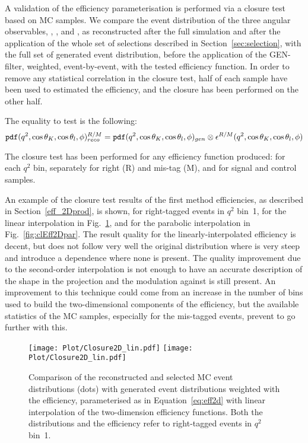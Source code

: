 A validation of the efficiency parameterisation is performed via a closure test based on MC samples.
We compare the event distribution of the three angular observables, \cTK, \cTL, and \PHI, as reconstructed after the full simulation and after the application of the whole set of selections described in Section~\ref{sec:selection}, with the full set of generated event distribution, before the application of the GEN-filter, weighted, event-by-event, with the tested efficiency function.
In order to remove any statistical correlation in the closure test, half of each sample have been used to estimated the efficiency, and the closure has been performed on the other half.

The equality to test is the following:
\begin{equation}\label{eq:effClosure}
    \mathtt{pdf}(q^2,\cos\theta_K,\cos\theta_l,\phi)_{reco}^{R/M}=\mathtt{pdf}(q^2,\cos\theta_K,\cos\theta_l,\phi)_{gen}\otimes\epsilon^{R/M}(q^2,\cos\theta_K,\cos\theta_l,\phi)
\end{equation}

The closure test has been performed for any efficiency function produced: for each $q^2$ bin, separately for right (R) and mis-tag (M), and for signal and control samples.

An example of the closure test results of the first method efficiencies, as described in Section~\ref{eff_2Dprod}, is shown, for right-tagged events in $q^2$ bin~1, for the linear interpolation in Fig.~\ref{fig:clEff2Dlin}, and for the parabolic interpolation in Fig.~\ref{fig:clEff2Dpar}.
The result quality for the linearly-interpolated efficiency is decent, but does not follow very well the original distribution where is very steep and introduce a \PHI dependence where none is present.
The quality improvement due to the second-order interpolation is not enough to have an accurate description of the shape in the \cTK projection and the modulation against \PHI is still present.
An improvement to this technique could come from an increase in the number of bins used to build the two-dimensional components of the efficiency, but the available statistics of the MC samples, especially for the mis-tagged events, prevent to go further with this.

\begin{figure}[hbt]
    \texttt{[image: Plot/Closure2D\_lin.pdf]}
    \texttt{[image: Plot/Closure2D\_lin.pdf]}
    \caption{Comparison of the reconstructed and selected MC event distributions (dots) with generated event distributions weighted with the efficiency, parameterised as in Equation~\ref{eq:eff2d} with linear interpolation of the two-dimension efficiency functions. Both the distributions and the efficiency refer to right-tagged events in $q^2$ bin~1.}
    \label{fig:clEff2Dlin}
\end{figure}

